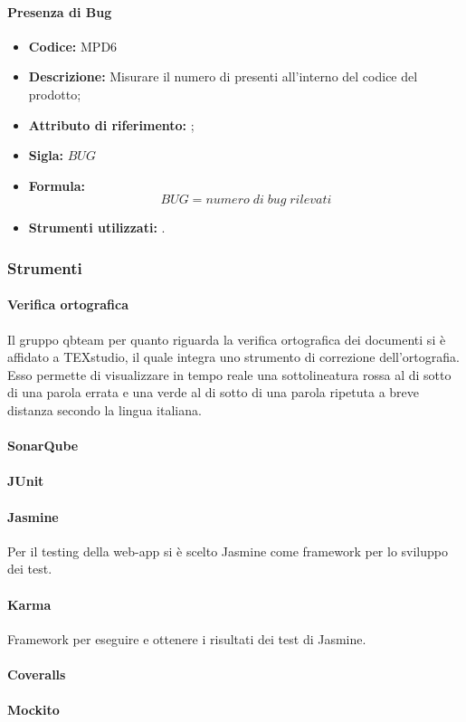 \paragraph{Presenza di Bug} 
\begin{itemize}
    \item \textbf{Codice:} MPD6
    \item \textbf{Descrizione:} Misurare il numero di  presenti all'interno del codice del prodotto;
    \item \textbf{Attributo di riferimento:} ;
    \item \textbf{Sigla:} $BUG$
    \item \textbf{Formula:} $$BUG = {numero \; di \; bug \; rilevati}$$
    \item \textbf{Strumenti utilizzati:} .
\end{itemize}


\subsubsection{Strumenti}

\paragraph{Verifica ortografica}
Il gruppo qbteam per quanto riguarda la verifica ortografica dei documenti si è affidato a TEXstudio, il quale integra uno strumento di correzione dell'ortografia. Esso permette di visualizzare in tempo reale una sottolineatura rossa al di sotto di una parola errata e una verde al di sotto di una parola ripetuta a breve distanza secondo la lingua italiana.  
\paragraph{SonarQube}
\paragraph{JUnit}
\paragraph{Jasmine}
Per il testing della web-app si è scelto Jasmine come framework per lo sviluppo dei test.
\paragraph{Karma}
Framework per eseguire e ottenere i risultati dei test di Jasmine.
\paragraph{Coveralls}
\paragraph{Mockito}